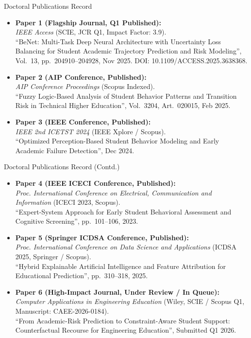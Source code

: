 \documentclass{beamer}
\begin{document}
\begin{frame}{Doctoral Publications Record}
  \begin{itemize}\setlength{\itemsep}{6pt}\footnotesize
    \item \textbf{Paper 1 (Flagship Journal, Q1 Published):}\\
    \textit{IEEE Access} (SCIE, JCR Q1, Impact Factor: 3.9).\\
    ``BeNet: Multi-Task Deep Neural Architecture with Uncertainty Loss Balancing for Student Academic Trajectory Prediction and Risk Modeling'', Vol.~13, pp.~204910--204928, Nov 2025. DOI: 10.1109/ACCESS.2025.3638368.
    
    \item \textbf{Paper 2 (AIP Conference, Published):}\\
    \textit{AIP Conference Proceedings} (Scopus Indexed).\\
    ``Fuzzy Logic-Based Analysis of Student Behavior Patterns and Transition Risk in Technical Higher Education'', Vol.~3204, Art.~020015, Feb 2025.
    
    \item \textbf{Paper 3 (IEEE Conference, Published):}\\
    \textit{IEEE 2nd ICETST 2024} (IEEE Xplore / Scopus).\\
    ``Optimized Perception-Based Student Behavior Modeling and Early Academic Failure Detection'', Dec 2024.
  \end{itemize}
\end{frame}

\begin{frame}{Doctoral Publications Record (Contd.)}
  \begin{itemize}\setlength{\itemsep}{6pt}\footnotesize
    \item \textbf{Paper 4 (IEEE ICECI Conference, Published):}\\
    \textit{Proc. International Conference on Electrical, Communication and Information} (ICECI 2023, Scopus).\\
    ``Expert-System Approach for Early Student Behavioral Assessment and Cognitive Screening'', pp.~101--106, 2023.
    
    \item \textbf{Paper 5 (Springer ICDSA Conference, Published):}\\
    \textit{Proc. International Conference on Data Science and Applications} (ICDSA 2025, Springer / Scopus).\\
    ``Hybrid Explainable Artificial Intelligence and Feature Attribution for Educational Prediction'', pp.~310--318, 2025.
    
    \item \textbf{Paper 6 (High-Impact Journal, Under Review / In Queue):}\\
    \textit{Computer Applications in Engineering Education} (Wiley, SCIE / Scopus Q1, Manuscript: CAEE-2026-0184).\\
    ``From Academic-Risk Prediction to Constraint-Aware Student Support: Counterfactual Recourse for Engineering Education'', Submitted Q1 2026.
  \end{itemize}
\end{frame}
\end{document}
